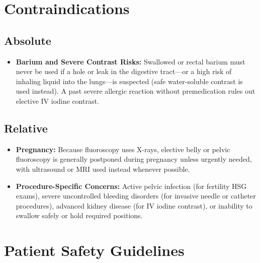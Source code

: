 \section{Contraindications}

\subsection{Absolute}

\begin{itemize}
    \item \textbf{Barium and Severe Contrast Risks:} Swallowed or rectal barium must never be used if a hole or leak in the digestive tract---or a high risk of inhaling liquid into the lungs---is suspected (safe water-soluble contrast is used instead). A past severe allergic reaction without premedication rules out elective IV iodine contrast.
\end{itemize}

\subsection{Relative}

\begin{itemize}
    \item \textbf{Pregnancy:} Because fluoroscopy uses X-rays, elective belly or pelvic fluoroscopy is generally postponed during pregnancy unless urgently needed, with ultrasound or MRI used instead whenever possible.
    \item \textbf{Procedure-Specific Concerns:} Active pelvic infection (for fertility HSG exams), severe uncontrolled bleeding disorders (for invasive needle or catheter procedures), advanced kidney disease (for IV iodine contrast), or inability to swallow safely or hold required positions.
\end{itemize}

\section{Patient Safety Guidelines}

